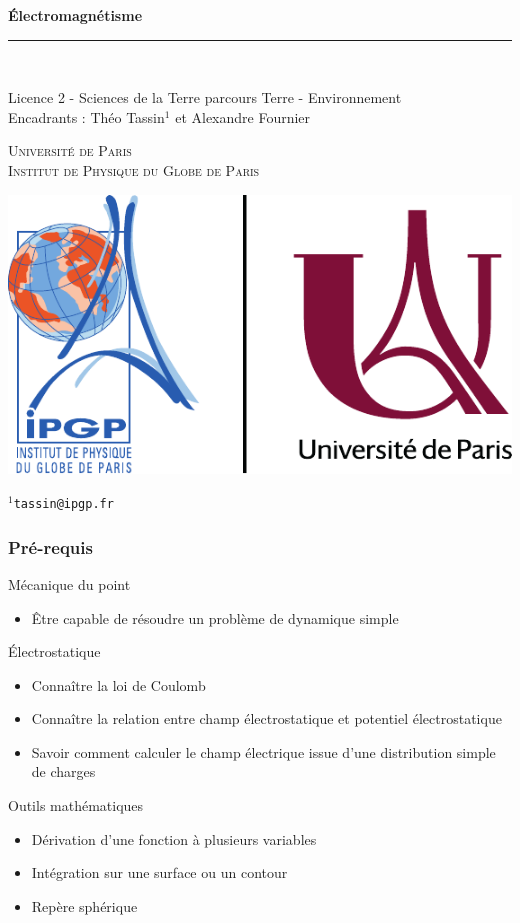 \documentclass[9pt, dvipsnames,aspectratio=169]{beamer}
\title{\Title}	%
\newcommand\Author{Licence 2 - Sciences de la Terre parcours Terre - 
Environnement}
\newcommand\Title{Électromagnétisme}
\newcommand\Laboratory{Université de Paris \\ Institut de Physique du Globe de Paris}
\begin{document}
\begin{frame}
	\begin{flushleft}
		\Huge{\textcolor{newblue}{\textbf{\Title}}} 
	\end{flushleft}
		\vspace{-0.7cm}
		\textcolor{neworange}{\rule{\linewidth}{1pt}}\\
	\begin{center}
		{\large{\Author}}\\
		\large{Encadrants : Théo Tassin$^1$ et 
		Alexandre Fournier}
	\end{center}
	\begin{flushleft}
		\textsc{\large{\Laboratory}}\\
	\end{flushleft}
	\begin{center}
		\begin{minipage}{0.5\linewidth}
			\centerline{\includegraphics[width=0.5\linewidth]
			{logo.pdf}}
		\end{minipage}

	\end{center}
	$^1$\texttt{tassin@ipgp.fr}
\end{frame}


\begin{frame}
	\frametitle{Pré-requis}
	\begin{alertblock}{Mécanique du point}
	\begin{itemize}
		\item Être capable de résoudre un problème
		 de dynamique simple
	\end{itemize}
	\end{alertblock}
	\vfill
	\begin{alertblock}{Électrostatique}
	\begin{itemize}
		\item Connaître la loi de Coulomb
		\item Connaître la relation entre champ électrostatique
		  et potentiel électrostatique
		\item Savoir comment calculer le champ électrique
		 issue d'une distribution simple de charges
	\end{itemize}
	\end{alertblock}
	\vfill
	\begin{alertblock}{Outils mathématiques}
	\begin{itemize}
		\item Dérivation d'une fonction à 
		 plusieurs variables
	        \item Intégration sur une surface ou un contour
		\item Repère sphérique
	\end{itemize}
	\end{alertblock}
\end{frame}
\end{document}
